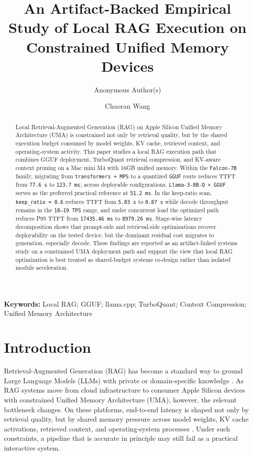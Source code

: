 \documentclass[10pt,twocolumn]{article}
\title{An Artifact-Backed Empirical Study of Local RAG Execution on Constrained Unified Memory Devices}
\author[1]{Anonymous Author(s)}
\affil[1]{Anonymous Institution}
\author[1]{Chaoran Wang}
\affil[1]{College of Science and Information, Qingdao Agricultural University, Qingdao, China\\
Email: \texttt{chaoranw47@gmail.com}}
\date{}
\begin{document}
\maketitle

\begin{abstract}
Local Retrieval-Augmented Generation (RAG) on Apple Silicon Unified Memory Architecture (UMA) is constrained not only by retrieval quality, but by the shared execution budget consumed by model weights, KV cache, retrieved context, and operating-system activity. This paper studies a local RAG execution path that combines GGUF deployment, TurboQuant retrieval compression, and KV-aware context pruning on a Mac mini M4 with 16GB unified memory. Within the \texttt{Falcon-7B} family, migrating from \texttt{transformers + MPS} to a quantized \texttt{GGUF} route reduces TTFT from \texttt{77.6 s} to \texttt{123.7 ms}; across deployable configurations, \texttt{Llama-3-8B-Q + GGUF} serves as the preferred practical reference at \texttt{51.2 ms}. In the keep-ratio scan, \texttt{keep\_ratio = 0.6} reduces TTFT from \texttt{5.83 s} to \texttt{0.87 s} while decode throughput remains in the \texttt{18--19 TPS} range, and under concurrent load the optimized path reduces P95 TTFT from \texttt{17435.46 ms} to \texttt{8979.26 ms}. Stage-wise latency decomposition shows that prompt-side and retrieval-side optimizations recover deployability on the tested device, but the dominant residual cost migrates to generation, especially decode. These findings are reported as an artifact-linked systems study on a constrained UMA deployment path and support the view that local RAG optimization is best treated as shared-budget systems co-design rather than isolated module acceleration.
\end{abstract}

\textbf{Keywords:} Local RAG; GGUF; llama.cpp; TurboQuant; Context Compression; Unified Memory Architecture

\section{Introduction}

Retrieval-Augmented Generation (RAG) has become a standard way to ground Large Language Models (LLMs) with private or domain-specific knowledge \cite{gao2023rag}. As RAG systems move from cloud infrastructure to consumer Apple Silicon devices with constrained Unified Memory Architecture (UMA), however, the relevant bottleneck changes. On these platforms, end-to-end latency is shaped not only by retrieval quality, but by shared memory pressure across model weights, KV cache activations, retrieved context, and operating-system processes \cite{hannun2023mlx}. Under such constraints, a pipeline that is accurate in principle may still fail as a practical interactive system.
\end{document}
